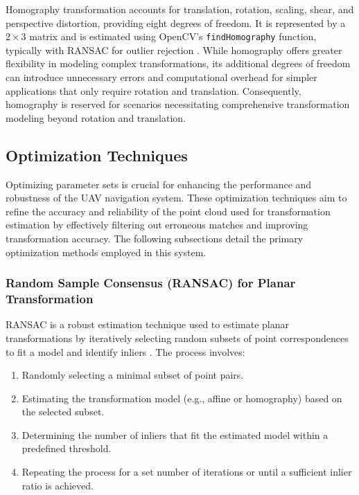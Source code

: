 Homography transformation accounts for translation, rotation, scaling, shear, and perspective distortion, providing eight degrees of freedom. It is represented by a \(2 \times 3\) matrix and is estimated using OpenCV's \texttt{findHomography} function, typically with RANSAC for outlier rejection \cite{opencv_homography}. While homography offers greater flexibility in modeling complex transformations, its additional degrees of freedom can introduce unnecessary errors and computational overhead for simpler applications that only require rotation and translation. Consequently, homography is reserved for scenarios necessitating comprehensive transformation modeling beyond rotation and translation.



\subsection{Optimization Techniques}

Optimizing parameter sets is crucial for enhancing the performance and robustness of the UAV navigation system. These optimization techniques aim to refine the accuracy and reliability of the point cloud used for transformation estimation by effectively filtering out erroneous matches and improving transformation accuracy. The following subsections detail the primary optimization methods employed in this system.

\subsubsection{Random Sample Consensus (RANSAC) for Planar Transformation}

RANSAC is a robust estimation technique used to estimate planar transformations by iteratively selecting random subsets of point correspondences to fit a model and identify inliers \cite{ransac1981random}. The process involves:

\begin{enumerate} 
    \item Randomly selecting a minimal subset of point pairs. 
    \item Estimating the transformation model (e.g., affine or homography) based on the selected subset. 
    \item Determining the number of inliers that fit the estimated model within a predefined threshold. 
    \item Repeating the process for a set number of iterations or until a sufficient inlier ratio is achieved. 
\end{enumerate}

